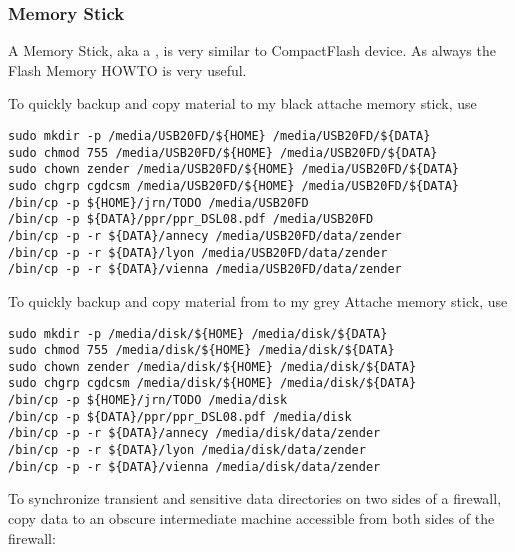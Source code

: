 \documentclass[12pt,twoside]{article}
\begin{document}
\subsubsection{Memory Stick}\label{sxn:memstick}
A Memory Stick, aka a ,  is very similar to
CompactFlash device. 
As always the Flash Memory HOWTO is very useful.

To quickly backup and copy material to my black attache memory stick,
use  
\begin{verbatim}
sudo mkdir -p /media/USB20FD/${HOME} /media/USB20FD/${DATA}
sudo chmod 755 /media/USB20FD/${HOME} /media/USB20FD/${DATA}
sudo chown zender /media/USB20FD/${HOME} /media/USB20FD/${DATA}
sudo chgrp cgdcsm /media/USB20FD/${HOME} /media/USB20FD/${DATA}
/bin/cp -p ${HOME}/jrn/TODO /media/USB20FD
/bin/cp -p ${DATA}/ppr/ppr_DSL08.pdf /media/USB20FD
/bin/cp -p -r ${DATA}/annecy /media/USB20FD/data/zender
/bin/cp -p -r ${DATA}/lyon /media/USB20FD/data/zender
/bin/cp -p -r ${DATA}/vienna /media/USB20FD/data/zender
\end{verbatim}
To quickly backup and copy material from  to my grey 
Attache memory stick, use  
\begin{verbatim}
sudo mkdir -p /media/disk/${HOME} /media/disk/${DATA}
sudo chmod 755 /media/disk/${HOME} /media/disk/${DATA}
sudo chown zender /media/disk/${HOME} /media/disk/${DATA}
sudo chgrp cgdcsm /media/disk/${HOME} /media/disk/${DATA}
/bin/cp -p ${HOME}/jrn/TODO /media/disk
/bin/cp -p ${DATA}/ppr/ppr_DSL08.pdf /media/disk
/bin/cp -p -r ${DATA}/annecy /media/disk/data/zender
/bin/cp -p -r ${DATA}/lyon /media/disk/data/zender
/bin/cp -p -r ${DATA}/vienna /media/disk/data/zender
\end{verbatim}
To synchronize transient and sensitive data directories
on two sides of a firewall, copy data to an obscure intermediate
machine accessible from both sides of the firewall:
\end{document}
